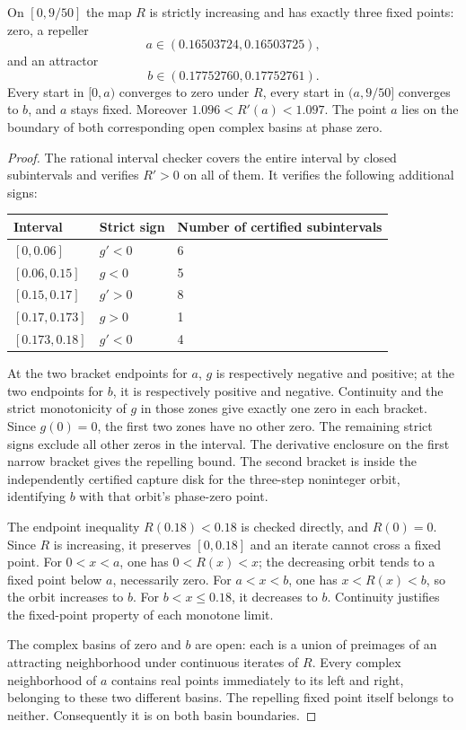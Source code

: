 \begin{theorem}\label{thm:real-separator}
On $[0,9/50]$ the map $R$ is strictly increasing and has exactly
three fixed points: zero, a repeller
\[
 a\in(0.16503724,0.16503725),
\]
and an attractor
\[
 b\in(0.17752760,0.17752761).
\]
Every start in $[0,a)$ converges to zero under $R$, every start in
$(a,9/50]$ converges to $b$, and $a$ stays fixed. Moreover
$1.096<R'(a)<1.097$. The point $a$ lies on the boundary of both
corresponding open complex basins at phase zero.
\end{theorem}
\begin{proof}
The rational interval checker 
covers the entire interval by closed subintervals and verifies
$R'>0$ on all of them. It verifies the following additional signs:
\begin{center}
\begin{tabular}{lll}\toprule
Interval&Strict sign&Number of certified subintervals\\\midrule
$[0,0.06]$&$g'<0$&6\\
$[0.06,0.15]$&$g<0$&5\\
$[0.15,0.17]$&$g'>0$&8\\
$[0.17,0.173]$&$g>0$&1\\
$[0.173,0.18]$&$g'<0$&4\\\bottomrule
\end{tabular}
\end{center}
At the two bracket endpoints for $a$, $g$ is respectively negative
and positive; at the two endpoints for $b$, it is respectively
positive and negative. Continuity and the strict monotonicity of
$g$ in those zones give exactly one zero in each bracket. Since
$g(0)=0$, the first two zones have no other zero. The remaining
strict signs exclude all other zeros in the interval. The derivative
enclosure on the first narrow bracket gives the repelling bound.
The second bracket is inside the independently certified capture
disk for the three-step noninteger orbit, identifying $b$ with that
orbit's phase-zero point.

The endpoint inequality $R(0.18)<0.18$ is checked directly, and
$R(0)=0$. Since $R$ is increasing, it preserves $[0,0.18]$ and an
iterate cannot cross a fixed point. For $0<x<a$, one has
$0<R(x)<x$; the decreasing orbit tends to a fixed point below $a$,
necessarily zero. For $a<x<b$, one has $x<R(x)<b$, so the orbit
increases to $b$. For $b<x\le0.18$, it decreases to $b$. Continuity
justifies the fixed-point property of each monotone limit.

The complex basins of zero and $b$ are open: each is a union of
preimages of an attracting neighborhood under continuous iterates
of $R$. Every complex neighborhood of $a$ contains real points
immediately to its left and right, belonging to these two different
basins. The repelling fixed point itself belongs to neither.
Consequently it is on both basin boundaries.
\end{proof}

